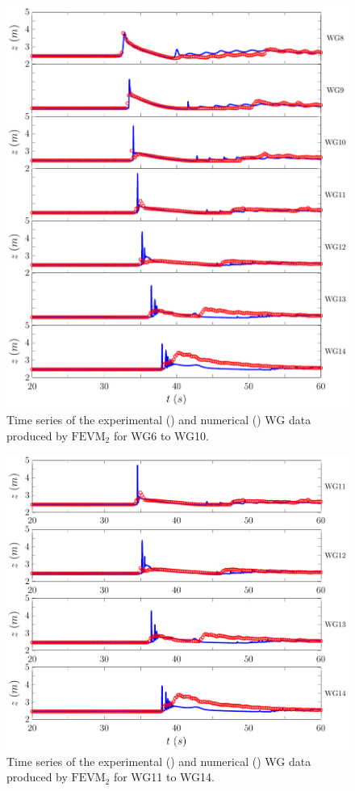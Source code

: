 \begin{figure}
	\centering
	\includegraphics[width=\textwidth]{./chp6/figures/Experiment/Roeber/Trial8/FEVM/LongWGs2.pdf}
	\caption{Time series of the experimental () and numerical ({\color{blue}\solidrule}) WG data produced by $\text{FEVM}_2$ for WG6 to WG10.}
	\label{fig:Roeber8WG6to10FEVM}
\end{figure} \begin{figure}
	\centering
	\includegraphics[width=\textwidth]{./chp6/figures/Experiment/Roeber/Trial8/FEVM/LongWGs3.pdf}
	\caption{Time series of the experimental () and numerical ({\color{blue}\solidrule}) WG data produced by $\text{FEVM}_2$ for WG11 to WG14.}
	\label{fig:Roeber8WG11to14FEVM}
\end{figure}

